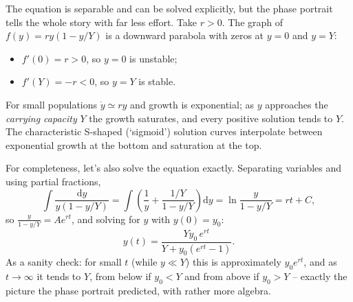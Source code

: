 The equation is separable and can be solved explicitly, but the phase portrait tells the whole story with far less effort. Take $r > 0$. The graph of $f(y) = ry(1 - y/Y)$ is a downward parabola with zeros at $y = 0$ and $y = Y$:
\begin{itemize}
	\item $f'(0) = r > 0$, so $y = 0$ is unstable;
	\item $f'(Y) = -r < 0$, so $y = Y$ is stable.
\end{itemize}

\begin{center}
\end{center}
For small populations $\dot y \simeq ry$ and growth is exponential; as $y$ approaches the \emph{carrying capacity} $Y$ the growth saturates, and every positive solution tends to $Y$. The characteristic S-shaped (`sigmoid') solution curves interpolate between exponential growth at the bottom and saturation at the top.

For completeness, let's also solve the equation exactly. Separating variables and using partial fractions,
$$
\int \frac{\mathrm{d}y}{y(1 - y/Y)} = \int \left(\frac 1y + \frac{1/Y}{1 - y/Y}\right)\mathrm{d}y = \ln \frac{y}{1 - y/Y} = rt + C,
$$
so $\frac{y}{1 - y/Y} = A e^{rt}$, and solving for $y$ with $y(0) = y_0$:
$$
y(t) = \frac{Y y_0 \, e^{rt}}{Y + y_0(e^{rt} - 1)}.
$$
As a sanity check: for small $t$ (while $y \ll Y$) this is approximately $y_0 e^{rt}$, and as $t \to \infty$ it tends to $Y$, from below if $y_0 < Y$ and from above if $y_0 > Y$ -- exactly the picture the phase portrait predicted, with rather more algebra.

\begin{center}
\end{center}


